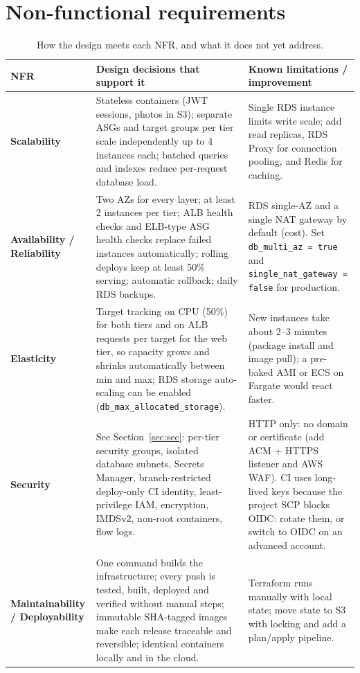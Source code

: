 \documentclass[10pt,a4paper]{article}
\begin{document}
\section{Non-functional requirements}\label{sec:nfr}
\begin{table}[H]\centering\small
\caption{How the design meets each NFR, and what it does not yet address.}\label{tab:nfr}
\begin{tabularx}{\linewidth}{@{}>{\raggedright\arraybackslash\bfseries}p{2.55cm} L L@{}}
\toprule
NFR & Design decisions that support it & Known limitations / improvement \\
\midrule
Scalability & Stateless containers (JWT sessions, photos in S3); separate ASGs and target groups per tier scale independently up to 4 instances each; batched queries and indexes reduce per-request database load. & Single RDS instance limits write scale; add read replicas, RDS Proxy for connection pooling, and Redis for caching. \\
Availability / Reliability & Two AZs for every layer; at least 2 instances per tier; ALB health checks and ELB-type ASG health checks replace failed instances automatically; rolling deploys keep at least 50\% serving; automatic rollback; daily RDS backups. & RDS single-AZ and a single NAT gateway by default (cost). Set \texttt{db\_multi\_az = true} and \texttt{single\_nat\_gateway = false} for production. \\
Elasticity & Target tracking on CPU (50\%) for both tiers and on ALB requests per target for the web tier, so capacity grows and shrinks automatically between min and max; RDS storage auto-scaling can be enabled (\texttt{db\_max\_allocated\_storage}). & New instances take about 2--3 minutes (package install and image pull); a pre-baked AMI or ECS on Fargate would react faster. \\
Security & See Section~\ref{sec:sec}: per-tier security groups, isolated database subnets, Secrets Manager, branch-restricted deploy-only CI identity, least-privilege IAM, encryption, IMDSv2, non-root containers, flow logs. & HTTP only: no domain or certificate (add ACM + HTTPS listener and AWS WAF). CI uses long-lived keys because the project SCP blocks OIDC: rotate them, or switch to OIDC on an advanced account. \\
Maintainability / Deployability & One command builds the infrastructure; every push is tested, built, deployed and verified without manual steps; immutable SHA-tagged images make each release traceable and reversible; identical containers locally and in the cloud. & Terraform runs manually with local state; move state to S3 with locking and add a plan/apply pipeline. \\

\end{tabularx}
\end{table}
\end{document}
